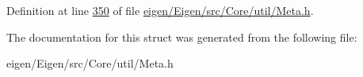 Definition at line \hyperlink{eigen_2_eigen_2src_2_core_2util_2_meta_8h_source_l00350}{350} of file \hyperlink{eigen_2_eigen_2src_2_core_2util_2_meta_8h_source}{eigen/\+Eigen/src/\+Core/util/\+Meta.\+h}.



The documentation for this struct was generated from the following file\+:\begin{DoxyCompactItemize}
\item 
eigen/\+Eigen/src/\+Core/util/\+Meta.\+h\end{DoxyCompactItemize}
